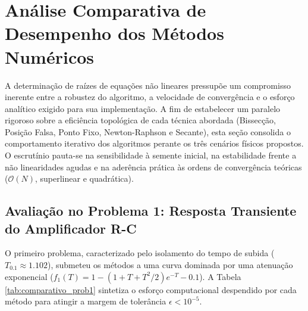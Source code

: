 \section{Análise Comparativa de Desempenho dos Métodos Numéricos}
\label{sec:analise_comparativa}

A determinação de raízes de equações não lineares pressupõe um compromisso inerente entre a robustez do algoritmo, a velocidade de convergência e o esforço analítico exigido para sua implementação. A fim de estabelecer um paralelo rigoroso sobre a eficiência topológica de cada técnica abordada (Bissecção, Posição Falsa, Ponto Fixo, Newton-Raphson e Secante), esta seção consolida o comportamento iterativo dos algoritmos perante os três cenários físicos propostos. O escrutínio pauta-se na sensibilidade à semente inicial, na estabilidade frente a não linearidades agudas e na aderência prática às ordens de convergência teóricas ($\mathcal{O}(N)$, superlinear e quadrática).

\subsection{Avaliação no Problema 1: Resposta Transiente do Amplificador R-C}
\label{subsec:comparativo_amplificador}

O primeiro problema, caracterizado pelo isolamento do tempo de subida ($T_{0.1} \approx 1.102$), submeteu os métodos a uma curva dominada por uma atenuação exponencial ($f_1(T) = 1 - (1+T+T^2/2)e^{-T} - 0.1$). A Tabela \ref{tab:comparativo_prob1} sintetiza o esforço computacional despendido por cada método para atingir a margem de tolerância $\epsilon < 10^{-5}$.

\begin{table}[htpb]
\centering
\caption{Quadro comparativo de desempenho para o Problema 1 (Busca de $T_{0.1}$).}
\label{tab:comparativo_prob1}
\small
{}
\end{table}

